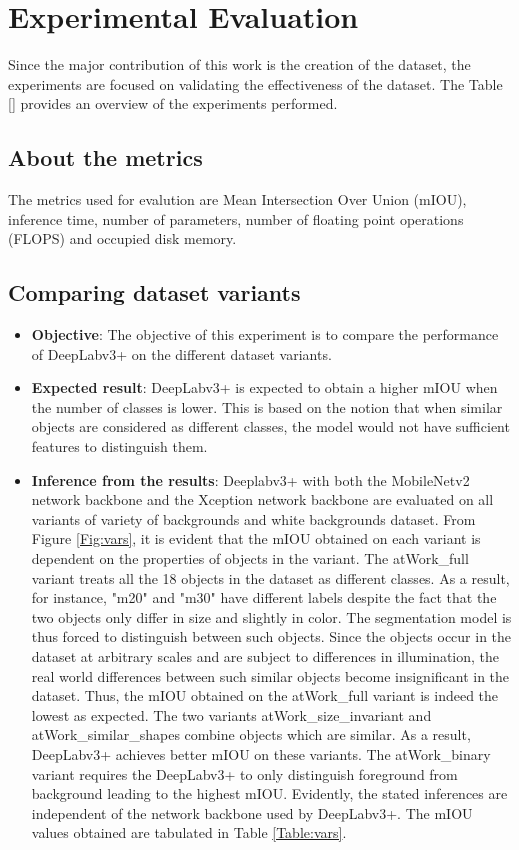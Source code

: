 
\chapter{Experimental Evaluation}

Since the major contribution of this work is the creation of the dataset, the experiments are focused on validating the effectiveness of the dataset. The Table [] provides an overview of the experiments performed.


\section{About the metrics}

The metrics used for evalution are Mean Intersection Over Union (mIOU), inference time, number of parameters, number of floating point operations (FLOPS) and occupied disk memory.


\section{Comparing dataset variants} 

	\begin{itemize}
		\item \textbf{Objective}: The objective of this experiment is to compare the performance of DeepLabv3+ on the different dataset variants.
		\item \textbf{Expected result}: DeepLabv3+ is expected to obtain a higher mIOU when the number of classes is lower. This is based on the notion that when similar objects are considered as different classes, the model would not have sufficient features to distinguish them.
		\item \textbf{Inference from the results}: Deeplabv3+ with both the MobileNetv2 network backbone and the Xception network backbone are evaluated on all variants of variety of backgrounds and white backgrounds dataset. From Figure \ref{Fig:vars}, it is evident that the mIOU obtained on each variant is dependent on the properties of objects in the variant. The atWork\_full variant treats all the 18 objects in the dataset as different classes. As a result, for instance, "m20" and "m30" have different labels despite the fact that the two objects only differ in size and slightly in color. The segmentation model is thus forced to distinguish between such objects. Since the objects occur in the dataset at arbitrary scales and are subject to differences in illumination, the real world differences between such similar objects become insignificant in the dataset. Thus, the mIOU obtained on the atWork\_full variant is indeed the lowest as expected. The two variants atWork\_size\_invariant and atWork\_similar\_shapes combine objects which are similar. As a result, DeepLabv3+ achieves better mIOU on these variants. The atWork\_binary variant requires the DeepLabv3+ to only distinguish foreground from background leading to the highest mIOU. Evidently, the stated inferences are independent of the network backbone used by DeepLabv3+. The mIOU values obtained are tabulated in Table \ref{Table:vars}.
	\end{itemize}
	
